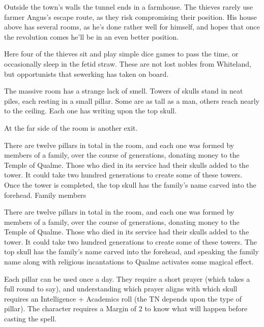 Outside the town's walls the tunnel ends in a farmhouse.  The thieves rarely use farmer Angus's escape route, as they risk compromising their position.  His house above has several rooms, as he's done rather well for himself, and hopes that once the revolution comes he'll be in an even better position.


Here four of the thieves sit and play simple dice games to pass the time, or occasionally sleep in the fetid straw.  These are not lost nobles from Whiteland, but opportunists that \gls{sewerking} has taken on board.


\humanthief



\begin{boxtext}

	The massive room has a strange lack of smell.  Towers of skulls stand in neat piles, each resting in a small pillar.  Some are as tall as a man, others reach nearly to the ceiling.  Each one has writing upon the top skull.

	At the far side of the room is another exit.

\end{boxtext}

There are twelve pillars in total in the room, and each one was formed by members of a family, over the course of generations, donating money to the Temple of Qualme.  Those who died in its service had their skulls added to the tower.  It could take two hundred generations to create some of these towers.  Once the tower is completed, the top skull has the family's name carved into the forehead.  Family members

There are twelve pillars in total in the room, and each one was formed by members of a family, over the course of generations, donating money to the Temple of Qualme.  Those who died in its service had their skulls added to the tower.  It could take two hundred generations to create some of these towers.  The top skull has the family's name carved into the forehead, and speaking the family name along with religious incantations to Qualme activates some magical effect.

Each pillar can be used once a day.  They require a short prayer (which takes a full round to say), and understanding which prayer aligns with which skull requires an Intelligence + Academics roll (the TN depends upon the type of pillar).  The character requires a Margin of 2 to know what will happen before casting the spell.

